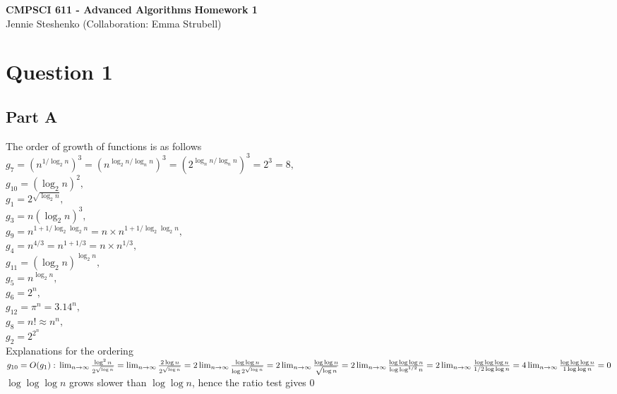 \documentclass{article}
\begin{document}
\begin{center} \LARGE\textbf{CMPSCI 611 - Advanced Algorithms}
\Large\textbf{Homework 1}
\vspace{0.5cm}\\Jennie Steshenko \small{(Collaboration: Emma Strubell)}
\end{center}

\section*{Question 1}
\subsection*{Part A}
The order of growth of functions is as follows\\ 
$ g_7 = (n^{1/\log_2 n})^3 = (n^{{\log_2 n}/{\log_n n}})^3 = (2^{{\log_n
n}/{\log_n n}})^3 = 2^3 = 8,$\\
$g_{10} = (\log_2 n)^2,$\\
$g_1 = 2^{\sqrt{\log_2 n}},$\\
$g_3 = n(\log_2 n)^3,$\\
$g_9 = n^{1+1/\log_2 \log_2 n} = n \times {n^{1+1/\log_2 \log_2 n}},$\\ 
$g_4 = n^{4/3} = n^{1+1/3} = n \times n^{1/3},$\\
$g_{11} = (\log_2 n)^{\log_2 n},$\\
$g_5 = n^{\log_2 n},$\\
$g_6 = 2^n,$\\
$g_{12} = \pi^n = 3.14^n,$\\
$g_8 = n! \approx{n^n},$\\
$g_2 = 2^{2^n}$\\

Explanations for the ordering\\

$g_{10} = O(g_1):\\
\lim_{n\to\infty}\frac{\log^2n}{2^{\sqrt{\log n}}} =
\lim_{n\to\infty}\frac{2\log n}{2^{\sqrt{\log n}}} =
2\lim_{n\to\infty}\frac{\log\log n}{\log2^{\sqrt{\log n}}} = 
2\lim_{n\to\infty}\frac{\log\log n}{\sqrt{\log n}} =  
2\lim_{n\to\infty}\frac{\log\log\log n}{\log\log^{1/2}n} =
2\lim_{n\to\infty}\frac{\log\log\log n}{1/2\log\log n} = 
4\lim_{n\to\infty}\frac{\log\log\log n}{1\log\log n} = 0$\\
$\log\log\log n$ grows slower than $\log\log n$, hence the ratio test gives 0\\
\end{document}
